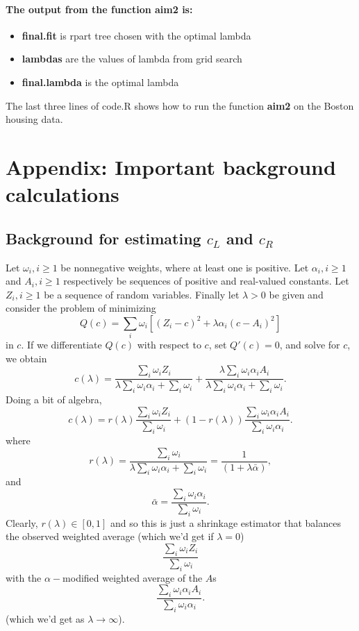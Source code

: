 \documentclass[12pt]{article}
\begin{document}
\paragraph{The output from the function {\bf aim2} is:}
\begin{itemize}
\item {\bf final.fit} is rpart tree chosen with the optimal lambda
\item {\bf lambdas} are the values of lambda from grid search
\item {\bf final.lambda} is the optimal lambda 
\end{itemize} 

The last three lines of code.R shows how to run the function {\bf aim2} on the Boston
housing data.


\section{Appendix: Important background calculations}
\label{bkgrnd}
\subsection{Background for estimating $c_L$ and $c_R$}
\label{Est}
Let $\omega_i, i \geq 1$ be nonnegative weights, where at least one is
positive. Let $\alpha_i, i \geq 1$ and $A_i, i \geq 1$ respectively be
sequences of positive and real-valued constants. Let $Z_i, i \geq 1$
be a sequence of random variables. Finally let $\lambda > 0$ be given
and consider the problem of minimizing
\[
Q(c) = {\textstyle \sum\nolimits}_i \omega_i \left[ (Z_{i}-c)^2 + \lambda \alpha_i (c-A_i)^2 \right]
\]
in $c$.  If we differentiate $Q(c)$ with respect to $c$, set $Q'(c) = 0$, and solve for $c$, we obtain
\[
c(\lambda) = \frac{\sum_i \omega_i Z_i}{\lambda \sum_i \omega_i \alpha_i + \sum_i \omega_i}
+  \frac{ \lambda \sum_i \omega_i \alpha_i A_i}{\lambda \sum_i \omega_i \alpha_i + \sum_i \omega_i}.
\]
Doing a bit of algebra,
\begin{equation}
\label{clambda}
c(\lambda) = r(\lambda) \frac{\sum_i \omega_i Z_i}{\sum_i \omega_i}
+  (1-r(\lambda)) \frac{ \sum_i \omega_i \alpha_i A_i}{ \sum_i \omega_i \alpha_i }.
\end{equation}
where
\begin{equation}
\label{rlambda}
r(\lambda) = \frac{\sum_i \omega_i}{\lambda \sum_i \omega_i \alpha_i + \sum_i \omega_i}  = 
\frac{1}{(1 + \lambda \bar{\alpha})},
\end{equation}
and
\begin{equation}
\label{baralpha}
 \bar{\alpha} = \frac{\sum_i \omega_i \alpha_i}{\sum_i \omega_i}.
\end{equation}
Clearly, $r(\lambda) \in [0,1]$ and so this is just a shrinkage
estimator that balances the observed weighted average (which we'd get
if $\lambda = 0$)
\[
 \frac{\sum_i \omega_i Z_i}{\sum_i \omega_i}
\]
with the $\alpha-$modified weighted average of the $A$s
\[
\frac{ \sum_i \omega_i \alpha_i A_i}{ \sum_i \omega_i \alpha_i }.
\]
(which we'd get as $\lambda \rightarrow \infty$).
\end{document}
